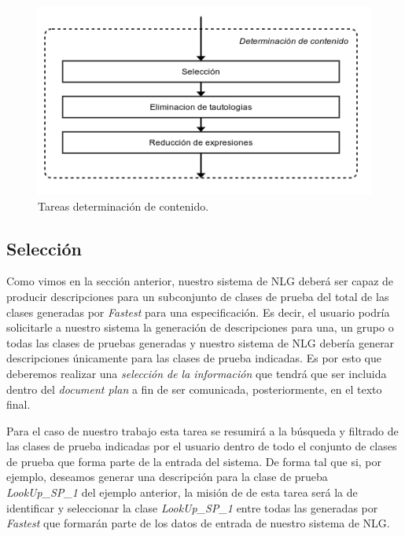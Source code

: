 \begin{figure}[H]
  	\centering
	\includegraphics[scale=0.4]{img/tareas_determinacion_contenido.png}
	\caption{Tareas determinación de contenido.}
  	\label{fig:tareas_determinacion_contenido}
\end{figure}

\subsection*{Selección}
Como vimos en la sección anterior, nuestro sistema de NLG deberá ser capaz de producir descripciones para un subconjunto de clases de prueba del total de las clases generadas por \emph{Fastest} para una especificación. Es decir, el usuario podría solicitarle a nuestro sistema la generación de descripciones para una, un grupo o todas las clases de pruebas generadas y nuestro sistema de NLG debería generar descripciones únicamente para las clases de prueba indicadas. Es por esto que deberemos realizar una \emph{selección de la información} que tendrá que ser incluida dentro del \textit{document plan} a fin de ser comunicada, posteriormente, en el texto final.

Para el caso de nuestro trabajo esta tarea se resumirá a la búsqueda y filtrado de las clases de prueba indicadas por el usuario dentro de todo el conjunto de clases de prueba que forma parte de la entrada del sistema. De forma tal que si, por ejemplo, deseamos generar una descripción para la clase de prueba \emph{LookUp\_SP\_1} del ejemplo anterior, la misión de de esta tarea será la de identificar y seleccionar la clase \emph{LookUp\_SP\_1} entre todas las generadas por \emph{Fastest} que formarán parte de los datos de entrada de nuestro sistema de NLG.


